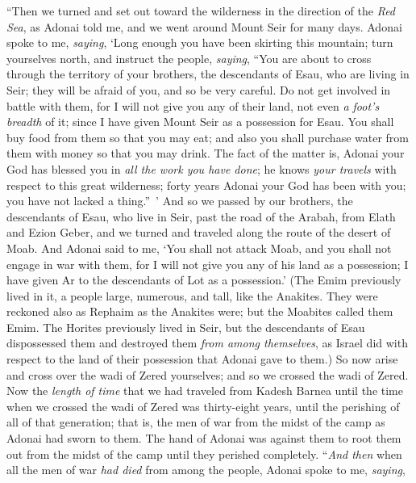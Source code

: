 \begin{biblechapter} %
\verse “Then we turned and set out toward the wilderness in the direction of the \textit{Red Sea}, as Adonai told me, and we went around Mount Seir for many days.
\verse Adonai spoke to me, \textit{saying},
\verse ‘Long enough you have been skirting this mountain; turn yourselves north,
\verse and instruct the people, \textit{saying}, “You are about to cross through the territory of your brothers, the descendants of Esau, who are living in Seir; they will be afraid of you, and so be very careful.
\verse Do not get involved in battle with them, for I will not give you any of their land, not even \textit{a foot’s breadth} of it; since I have given Mount Seir as a possession for Esau.
\verse You shall buy food from them so that you may eat; and also you shall purchase water from them with money so that you may drink.
\verse The fact of the matter is, Adonai your God has blessed you in \textit{all the work you have done}; he knows \textit{your travels} with respect to this great wilderness; forty years Adonai your God has been with you; you have not lacked a thing.” ’
\verse And so we passed by our brothers, the descendants of Esau, who live in Seir, past the road of the Arabah, from Elath and Ezion Geber, and we turned and traveled along the route of the desert of Moab.
\verse And Adonai said to me, ‘You shall not attack Moab, and you shall not engage in war with them, for I will not give you any of his land as a possession; I have given Ar to the descendants of Lot as a possession.’
\verse (The Emim previously lived in it, a people large, numerous, and tall, like the Anakites.
\verse They were reckoned also as Rephaim as the Anakites were; but the Moabites called them Emim.
\verse The Horites previously lived in Seir, but the descendants of Esau dispossessed them and destroyed them \textit{from among themselves}, as Israel did with respect to the land of their possession that Adonai gave to them.)
\verse So now arise and cross over the wadi of Zered yourselves; and so we crossed the wadi of Zered.
\verse Now the \textit{length of time} that we had traveled from Kadesh Barnea until the time when we crossed the wadi of Zered was thirty-eight years, until the perishing of all of that generation; that is, the men of war from the midst of the camp as Adonai had sworn to them.
\verse The hand of Adonai was against them to root them out from the midst of the camp until they perished completely.
\verse “\textit{And then} when all the men of war \textit{had died} from among the people,
\verse Adonai spoke to me, \textit{saying},

\end{biblechapter}
